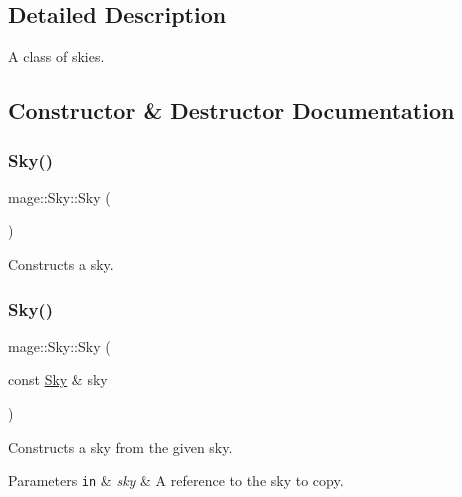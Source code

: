 \subsection{Detailed Description}
A class of skies. 

\subsection{Constructor \& Destructor Documentation}
\hypertarget{classmage_1_1_sky_a4e54074f11814aee89e2554f35e551aa}{}\label{classmage_1_1_sky_a4e54074f11814aee89e2554f35e551aa} 
\subsubsection{\texorpdfstring{Sky()}{Sky()}\hspace{0.1cm}{\footnotesize\ttfamily [1/3]}}
{\footnotesize\ttfamily mage\+::\+Sky\+::\+Sky (\begin{DoxyParamCaption}{ }\end{DoxyParamCaption})\hspace{0.3cm}{\ttfamily [default]}}

Constructs a sky. \hypertarget{classmage_1_1_sky_ab041650afed6344cd7874308def5c35c}{}\label{classmage_1_1_sky_ab041650afed6344cd7874308def5c35c} 
\subsubsection{\texorpdfstring{Sky()}{Sky()}\hspace{0.1cm}{\footnotesize\ttfamily [2/3]}}
{\footnotesize\ttfamily mage\+::\+Sky\+::\+Sky (\begin{DoxyParamCaption}\item[{const \hyperlink{classmage_1_1_sky}{Sky} \&}]{sky }\end{DoxyParamCaption})\hspace{0.3cm}{\ttfamily [default]}}

Constructs a sky from the given sky.


\begin{DoxyParams}[1]{Parameters}
\mbox{\tt in}  & {\em sky} & A reference to the sky to copy. \\
\hline
\end{DoxyParams}
\hypertarget{classmage_1_1_sky_acf43250f4e0af2e3ab262c6c36b19a9a}{}\label{classmage_1_1_sky_acf43250f4e0af2e3ab262c6c36b19a9a} 

